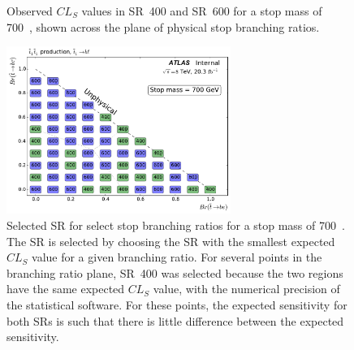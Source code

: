 \begin{figure}[ht]
  \centering
  \caption{
    Observed $CL_S$ values in SR~400 and SR~600 for a stop mass of 700~\GeV,
    shown across the plane of physical stop branching ratios.
  }
\end{figure}

\begin{figure}[ht]
  \centering
  \includegraphics[width=0.65\textwidth]
    {figs/blstop/region_selection/region_choice_vs_br_m_700.pdf}
  \caption{
    Selected SR for select stop branching ratios for a stop mass of 700~\GeV.
    The SR is selected by choosing the SR with the smallest expected $CL_S$
    value for a given branching ratio.
    For several points in the branching ratio plane, SR~400 was selected because
    the two regions have the same expected $CL_S$ value, with the numerical
    precision of the statistical software.
    For these points, the expected sensitivity for both SRs is such that
    there is little difference between the expected sensitivity.
  }
\end{figure}


